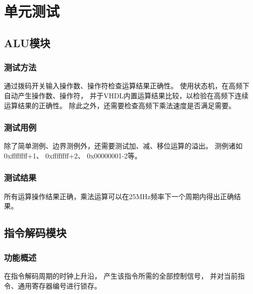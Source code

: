 \section{单元测试}


    \subsection{ALU模块}


        \subsubsection{测试方法}
            通过拨码开关输入操作数、操作符检查运算结果正确性。%
            使用状态机，在高频下自动产生操作数、操作符，%
            并于VHDL内置运算结果比较，以检验在高频下连续运算结果的正确性。%
            除此之外，还需要检查高频下乘法速度是否满足需要。

        \subsubsection{测试用例}
            除了简单测例、边界测例外，还需要测试加、减、移位运算的溢出。
            测例诸如%
            0xffffffff+1、%
            0xffffffff+2、%
            0x00000001-2等。

        \subsubsection{测试结果}
            所有运算操作结果正确，乘法运算可以在25MHz频率下一个周期内得出正确结果。

    \subsection{指令解码模块}
        \subsubsection{功能概述}
            在指令解码周期的时钟上升沿，%
            产生该指令所需的全部控制信号，%
            并对当前指令、通用寄存器编号进行锁存。

